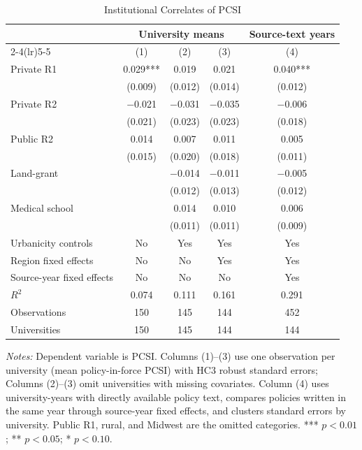\begin{table}[htbp]
\centering
\small
\caption{Institutional Correlates of PCSI}
\label{tab:inst-reg}
\begin{threeparttable}
\begin{tabular}{lcccc}
\toprule
 & \multicolumn{3}{c}{University means} & Source-text years \\
\cmidrule(lr){2-4}\cmidrule(lr){5-5}
 & (1) & (2) & (3) & (4) \\
\midrule
Private R1 & 0.029*** & 0.019 & 0.021 & 0.040*** \\
 & (0.009) & (0.012) & (0.014) & (0.012) \\
Private R2 & $-$0.021 & $-$0.031 & $-$0.035 & $-$0.006 \\
 & (0.021) & (0.023) & (0.023) & (0.018) \\
Public R2 & 0.014 & 0.007 & 0.011 & 0.005 \\
 & (0.015) & (0.020) & (0.018) & (0.011) \\
Land-grant &  & $-$0.014 & $-$0.011 & $-$0.005 \\
 &  & (0.012) & (0.013) & (0.012) \\
Medical school &  & 0.014 & 0.010 & 0.006 \\
 &  & (0.011) & (0.011) & (0.009) \\
\midrule
Urbanicity controls & No & Yes & Yes & Yes \\
Region fixed effects & No & No & Yes & Yes \\
Source-year fixed effects & No & No & No & Yes \\
$R^2$ & 0.074 & 0.111 & 0.161 & 0.291 \\
Observations & 150 & 145 & 144 & 452 \\
Universities & 150 & 145 & 144 & 144 \\
\bottomrule
\end{tabular}
\begin{tablenotes}[flushleft]\footnotesize
\item \textit{Notes:} Dependent variable is PCSI. Columns (1)--(3) use one observation per university (mean policy-in-force PCSI) with HC3 robust standard errors; Columns (2)--(3) omit universities with missing covariates. Column (4) uses university-years with directly available policy text, compares policies written in the same year through source-year fixed effects, and clusters standard errors by university. Public R1, rural, and Midwest are the omitted categories. *** $p<0.01$; ** $p<0.05$; * $p<0.10$.
\end{tablenotes}
\end{threeparttable}
\end{table}
